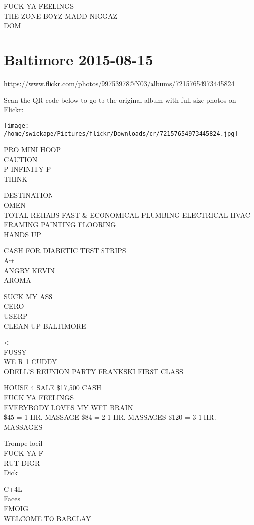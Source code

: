 \documentclass[10pt,letterpaper]{article}
\begin{document}
FUCK YA FEELINGS\\
THE ZONE BOYZ MADD NIGGAZ\\
DOM


\section*{Baltimore 2015-08-15}

\url{https://www.flickr.com/photos/99753978@N03/albums/72157654973445824}

Scan the QR code below to go to the original album with full-size photos on Flickr:

\texttt{[image: /home/swickape/Pictures/flickr/Downloads/qr/72157654973445824.jpg]}


PRO MINI HOOP\\
CAUTION\\
P INFINITY P\\
THINK

DESTINATION\\
OMEN\\
TOTAL REHABS FAST \& ECONOMICAL PLUMBING ELECTRICAL HVAC FRAMING PAINTING FLOORING\\
HANDS UP

CASH FOR DIABETIC TEST STRIPS\\
Art\\
ANGRY KEVIN\\
AROMA

SUCK MY ASS\\
CERO\\
USERP\\
CLEAN UP BALTIMORE

<{-}\\
FUSSY\\
WE R 1 CUDDY\\
ODELL'S REUNION PARTY FRANKSKI FIRST CLASS

HOUSE 4 SALE \$17,500 CASH\\
FUCK YA FEELINGS\\
EVERYBODY LOVES MY WET BRAIN\\
\$45 = 1 HR. MASSAGE \$84 = 2 1 HR. MASSAGES  \$120 = 3 1 HR. MASSAGES

Trompe{-}loeil\\
FUCK YA F\\
RUT DIGR\\
Dick

C+4L\\
Faces\\
FMOIG\\
WELCOME TO BARCLAY
\end{document}

